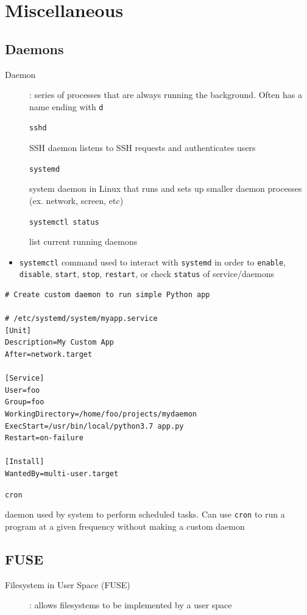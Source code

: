 \documentclass[letterpaper,12pt]{article}
\newcommand*{\lstitem}[1]{
  \setbox0\hbox{\lstinline{#1}}
  \item[\usebox0]
}
\begin{document}
\section{Miscellaneous}

\subsection{Daemons}
\begin{description}
 \item[Daemon]: series of processes that are always running the background. Often has a name ending with \lstinline{d}
       \lstitem{sshd} SSH daemon listens to SSH requests and authenticates users
       \lstitem{systemd} system daemon in Linux that runs and sets up smaller daemon processes (ex. network, screen, etc)
       \lstitem{systemctl status} list current running daemons
\end{description}

\begin{itemize}
 \item \lstinline{systemctl} command used to interact with \lstinline{systemd} in order to \lstinline{enable}, \lstinline{disable}, \lstinline{start}, \lstinline{stop}, \lstinline{restart}, or check \lstinline{status} of service/daemons
\end{itemize}

\begin{lstlisting}
# Create custom daemon to run simple Python app

# /etc/systemd/system/myapp.service
[Unit]
Description=My Custom App
After=network.target

[Service]
User=foo
Group=foo
WorkingDirectory=/home/foo/projects/mydaemon
ExecStart=/usr/bin/local/python3.7 app.py
Restart=on-failure

[Install]
WantedBy=multi-user.target
\end{lstlisting}

\begin{description}
 \lstitem{cron} daemon used by system to perform scheduled tasks. Can use \lstinline{cron} to run a program at a given frequency without making a custom daemon
\end{description}

\subsection{FUSE}
\begin{description}
 \item[Filesystem in User Space (FUSE)]: allows filesystems to be implemented by a user space
\end{description}
\end{document}
